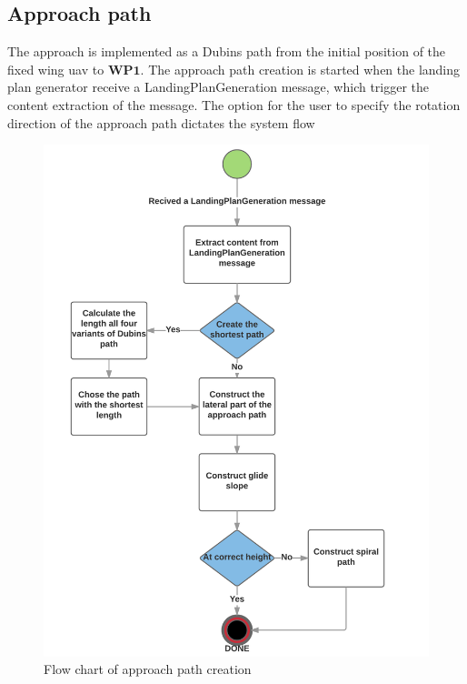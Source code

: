 \subsection{Approach path}
The approach is implemented as a Dubins path from the initial position of the fixed wing \gls{uav} to $\textbf{WP1}$. The approach path creation is started when the landing plan generator receive a LandingPlanGeneration message, which trigger the content extraction of the message. The option for the user to specify the rotation direction of the approach path dictates the system flow 
\begin{figure}[H]
\centering
\includegraphics[scale=0.8]{figs/ApproachPath.png}
\caption{Flow chart of approach path creation}
\label{Fig:FlowChartApproach}
\end{figure}
